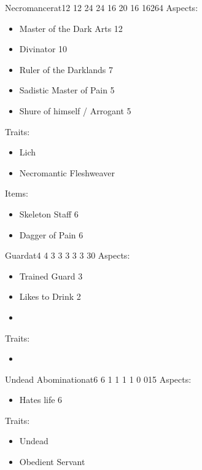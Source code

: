 \documentclass[11pt]{article}
\begin{document}
{\begin{npc}{Necromancer}{at}{12 12 24 24 16 20 16 16}{264}
Aspects:
\begin{itemize}
\item Master of the Dark Arts 12
\item Divinator 10
\item Ruler of the Darklands 7
\item Sadistic Master of Pain 5
\item Shure of himself / Arrogant 5
\end{itemize}

\columnbreak

Traits:
\begin{itemize}
\item Lich
\item Necromantic Fleshweaver
\end{itemize}

Items:
\begin{itemize}
\item Skeleton Staff 6
\item Dagger of Pain 6
\end{itemize}
\end{npc}

\begin{npc}{Guard}{at}{4 4 3 3 3 3 3 3}{0}
Aspects:
\begin{itemize}
\item Trained Guard 3
\item Likes to Drink 2
\item 
\end{itemize}

\columnbreak

Traits:
\begin{itemize}
\item 
\end{itemize}
\end{npc}

\begin{npc}{Undead Abomination}{at}{6 6 1 1 1 1 0 0}{15}
Aspects:
\begin{itemize}
\item Hates life 6
\end{itemize}

\columnbreak

Traits:
\begin{itemize}
\item Undead
\item Obedient Servant
\end{itemize}
\end{npc}
}
\end{document}
